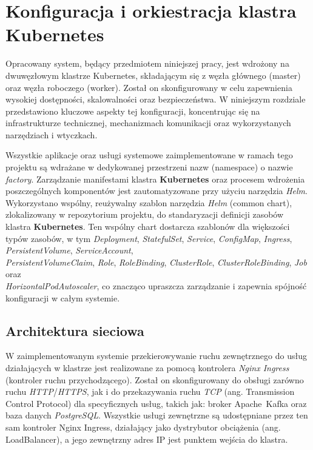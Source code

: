 \section{Konfiguracja i orkiestracja klastra Kubernetes}
\label{chap:konfiguracja_kubernetes}

Opracowany system, będący przedmiotem niniejszej pracy, jest wdrożony na dwuwęzłowym klastrze Kubernetes, składającym się z węzła głównego (master) oraz węzła roboczego (worker). Został on skonfigurowany w celu zapewnienia wysokiej dostępności, skalowalności oraz bezpieczeństwa. W niniejszym rozdziale przedstawiono kluczowe aspekty tej konfiguracji, koncentrując się na infrastrukturze technicznej, mechanizmach komunikacji oraz wykorzystanych narzędziach i wtyczkach.

Wszystkie aplikacje oraz usługi systemowe zaimplementowane w ramach tego projektu są wdrażane w dedykowanej przestrzeni nazw (namespace) o nazwie \textit{factory}. Zarządzanie manifestami klastra \textbf{Kubernetes} oraz procesem wdrożenia poszczególnych komponentów jest zautomatyzowane przy użyciu narzędzia \textit{Helm}. Wykorzystano wspólny, reużywalny szablon narzędzia \textit{Helm} (common chart), zlokalizowany w repozytorium projektu, do standaryzacji definicji zasobów klastra \textbf{Kubernetes}. Ten wspólny chart dostarcza szablonów dla większości typów zasobów, w tym \textit{Deployment}, \textit{StatefulSet}, \textit{Service}, \textit{ConfigMap}, \textit{Ingress}, \textit{PersistentVolume},  \textit{ServiceAccount}, \\ \textit{PersistentVolumeClaim},  \textit{Role}, \textit{RoleBinding}, \textit{ClusterRole},  \textit{ClusterRoleBinding}, \textit{Job} oraz \\ \textit{HorizontalPodAutoscaler}, co znacząco upraszcza zarządzanie i zapewnia spójność konfiguracji w całym systemie.

\subsection{Architektura sieciowa}

W zaimplementowanym systemie przekierowywanie ruchu zewnętrznego do usług działających w klastrze jest realizowane za pomocą kontrolera \textit{Nginx Ingress} (kontroler ruchu przychodzącego). Został on skonfigurowany do obsługi zarówno ruchu \textit{HTTP}/\textit{HTTPS}, jak i do przekazywania ruchu \textit{TCP} (ang. Transmission Control Protocol) \cite{tanenbaum2011computer} dla specyficznych usług, takich jak: broker \mbox{Apache Kafka} oraz baza danych \textit{PostgreSQL}. Wszystkie usługi zewnętrzne są udostępniane przez ten sam kontroler Nginx Ingress, działający jako dystrybutor obciążenia (ang. LoadBalancer), a jego zewnętrzny adres IP jest punktem wejścia do klastra.

